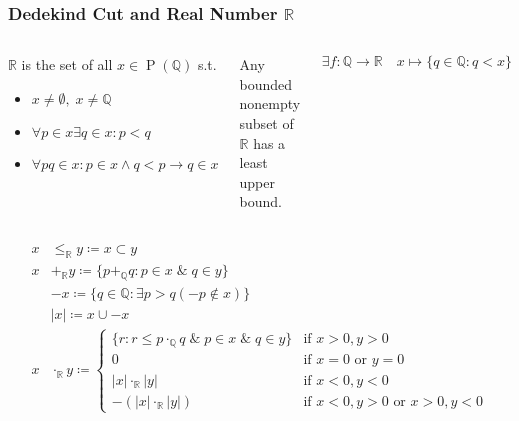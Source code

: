 \documentclass[UTF8,11pt,colorlinks,compress,openany]{beamer}%
\begin{document}
\begin{frame}\frametitle{Dedekind Cut and Real Number $\mathbb{R}$}
	\begin{columns}
	\begin{definition}
		$\mathbb{R}$ is the set of all $x\in \operatorname{P}(\mathbb{Q})$ s.t.
		\begin{itemize}
			\item $x\neq\emptyset,\;x\neq\mathbb{Q}$
			\item $\forall p\in x\exists q\in x: p<q$
			\item $\forall pq\in x: p\in x\wedge q<p\to q\in x$
		\end{itemize}
	\end{definition}
	\begin{theorem}
		Any bounded nonempty subset of $\mathbb{R}$ has a least upper bound.
	\end{theorem}\vspace{-3ex}
	\[\exists f:\mathbb{Q}\to\mathbb{R}\quad x\mapsto\{q\in\mathbb{Q}: q<x\}\]
	\end{columns}\vspace{-1ex}
	\begin{align*}
		x&\leq_{\mathbb{R}}y\coloneqq x\subset y\\
		x&+_{\mathbb{R}}y\coloneqq \{p+_{\mathbb{Q}}q: p\in x\;\&\;q\in y\}\\
		&-x\coloneqq \{q\in\mathbb{Q}: \exists p>q(-p\notin x)\}\\
		&|x|\coloneqq x\cup-x\\
		x&\cdot_{\mathbb{R}}y\coloneqq 
		\begin{cases}
			\{r: r\leq p\cdot_{\mathbb{Q}}q\;\&\;p\in x\;\&\;q\in y\} &\mbox{if $x>0, y>0$}\\
			0 &\mbox{if $x=0$ or $y=0$}\\
			|x|\cdot_{\mathbb{R}}|y| &\mbox{if $x<0, y<0$}\\
			-(|x|\cdot_{\mathbb{R}}|y|) &\mbox{if $x<0,y>0$ or $x>0,y<0$}
		\end{cases}
	\end{align*}
\end{frame}
\end{document}
